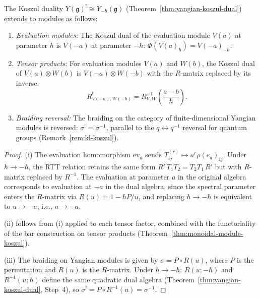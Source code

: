 \begin{proposition}
\label{prop:yangian-module-koszul}
The Koszul duality $Y(\mathfrak{g})^! \cong Y_{-\hbar}(\mathfrak{g})$
\textup{(}Theorem~\textup{\ref{thm:yangian-koszul-dual})} extends to
modules as follows:
\begin{enumerate}[label=\textup{(\roman*)}]
\item \emph{Evaluation modules:} The Koszul dual of the evaluation
  module $V(a)$ at parameter $\hbar$ is $V(-a)$ at parameter $-\hbar$:
  $\Phi(V(a)_\hbar) = V(-a)_{-\hbar}$.
\item \emph{Tensor products:} For evaluation modules $V(a)$ and
  $W(b)$, the Koszul dual of $V(a) \otimes W(b)$ is
  $V(-a) \otimes W(-b)$ with the $R$-matrix replaced by its inverse:
  \[
  R^!_{V(-a), W(-b)}
  = R_{V,W}^{-1}\!\left(\frac{a - b}{\hbar}\right).
  \]
\item \emph{Braiding reversal:} The braiding on the category of
  finite-dimensional Yangian modules is reversed:
  $\sigma^! = \sigma^{-1}$, parallel to the
  $q \leftrightarrow q^{-1}$ reversal for quantum groups
  \textup{(}Remark~\textup{\ref{rem:kl-koszul})}.
\end{enumerate}
\end{proposition}

\begin{proof}
(i) The evaluation homomorphism $\mathrm{ev}_a$ sends
$T_{ij}^{(r)} \mapsto a^r \rho(e_a)_{ij}$.  Under
$\hbar \to -\hbar$, the RTT relation retains the same form
$R'\, T_1 T_2 = T_2 T_1\, R'$ but with $R$-matrix replaced by
$R^{-1}$.  The evaluation at
parameter $a$ in the original algebra corresponds to evaluation
at $-a$ in the dual algebra, since the spectral parameter
enters the $R$-matrix via $R(u) = 1 - \hbar P/u$, and
replacing $\hbar \to -\hbar$ is equivalent to $u \to -u$, i.e.,
$a \to -a$.

(ii) follows from (i) applied to each tensor factor, combined
with the functoriality of the bar construction on tensor
products (Theorem~\ref{thm:monoidal-module-koszul}).

(iii) The braiding on Yangian modules is given by
$\sigma = P \circ R(u)$, where $P$ is the permutation and
$R(u)$ is the $R$-matrix.  Under $\hbar \to -\hbar$:
$R(u; -\hbar)$ and $R^{-1}(u; \hbar)$ define the same quadratic
dual algebra (Theorem~\ref{thm:yangian-koszul-dual}, Step~4), so
$\sigma^! = P \circ R^{-1}(u) = \sigma^{-1}$.
\end{proof}

